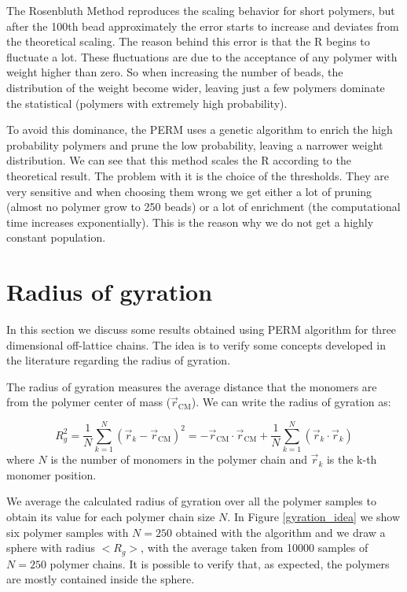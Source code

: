 \documentclass[aps,prl,reprint,groupedaddress]{revtex4-1}
\begin{document}
The Rosenbluth Method reproduces the scaling behavior for short polymers, but after the 100th bead approximately the error starts to increase and deviates from the theoretical scaling. The reason behind this error is that the R begins to fluctuate a lot. These fluctuations are due to the acceptance of any polymer with weight higher than zero. So when increasing the number of beads, the distribution of the weight become wider, leaving just a few polymers dominate the statistical (polymers with extremely high probability). 

To avoid this dominance, the PERM uses a genetic algorithm to enrich the high probability polymers and prune the low probability, leaving a narrower weight distribution. We can see that this method scales the R according to the theoretical result. The problem with it is the choice of the thresholds. They are very sensitive and when choosing them wrong we get either a lot of pruning (almost no polymer grow to 250 beads) or  a lot of enrichment (the computational time increases exponentially). This is the reason why we do not get a highly constant population.

\section{Radius of gyration}

In this section we discuss some results obtained using PERM algorithm for three dimensional off-lattice chains. The idea is to verify some concepts developed in the literature regarding the radius of gyration.

The radius of gyration measures the average distance that the monomers are from the polymer center of mass ($\vec{r}_{\text{CM}}$). We can write the radius of gyration as:

\begin{equation}
	R_g^2 = \frac{1}{N}\sum_{k=1}^N \left(\vec{r}_k - \vec{r}_{\text{CM}}\right)^2 = - \vec{r}_{\text{CM}} \cdot \vec{r}_{\text{CM}} + \frac{1}{N}\sum_{k=1}^N \left(\vec{r}_k \cdot \vec{r}_k \right)
\end{equation}
where $N$ is the number of monomers in the polymer chain and $\vec{r}_k$ is the k-th monomer position.

We average the calculated radius of gyration over all the polymer samples to obtain its value for each polymer chain size $N$. In Figure \ref{gyration_idea} we show six polymer samples with $N=250$ obtained with the algorithm and we draw a sphere with radius $<R_g>$, with the average taken from 10000 samples of $N=250$ polymer chains. It is possible to verify that, as expected, the polymers are mostly contained inside the sphere.  
\end{document}
